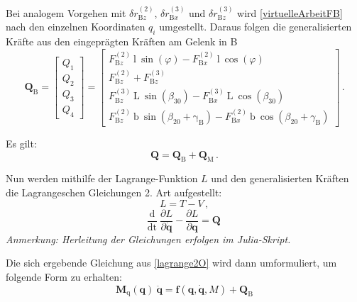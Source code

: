 \documentclass[]{scrartcl}
\begin{document}
Bei analogem Vorgehen mit $\delta r_{\mathrm{B}z}^{(2)}$, $\delta r_{\mathrm{B}x}^{(3)}$ und $\delta r_{\mathrm{B}z}^{(3)}$ wird \eqref{virtuelleArbeitFB} nach den einzelnen Koordinaten $q_i$ umgestellt. Daraus folgen die generalisierten Kräfte aus den eingeprägten Kräften am Gelenk in B
\begin{equation}
	\mathbf{Q}_{\mathrm{B}} = 
	\begin{bmatrix}
		Q_1 \\
		Q_2 \\
		Q_3 \\
		Q_4
	\end{bmatrix}
	=
	\begin{bmatrix}
		F_{\mathrm{B}z}^{(2)} ~ \mathrm{l} ~ \sin(\varphi) - F_{\mathrm{B}x}^{(2)} ~ \mathrm{l} ~ \cos(\varphi)\\
		F_{\mathrm{B}z}^{(2)} + F_{\mathrm{B}z}^{(3)} \\
		F_{\mathrm{B}z}^{(3)} ~ \mathrm{L} ~ \sin(\beta_{30}) - F_{\mathrm{B}x}^{(3)} ~ \mathrm{L} ~ \cos(\beta_{30}) \\
		F_{\mathrm{B}z}^{(2)} ~ \mathrm{b} ~ \sin(\beta_{20} + \mathrm{\gamma_B}) - F_{\mathrm{B}x}^{(2)} ~ \mathrm{b} ~ \cos(\beta_{20} + \gamma_{\mathrm{B}})
	\end{bmatrix} \, .
	\label{genKräfteQ_B}
\end{equation}

Es gilt:
\begin{equation}
	\mathbf{Q} = \mathbf{Q}_{\mathrm{B}} + \mathbf{Q}_{\mathrm{M}} \, .
\end{equation}

Nun werden mithilfe der Lagrange-Funktion $L$ und den generalisierten Kräften die Lagrangeschen Gleichungen 2. Art aufgestellt:
\begin{equation}
	L = T - V \, ,
\end{equation}
\begin{equation}
	\frac{\mathrm{d}}{\mathrm{dt}} ~ \frac{\partial L}{\partial \mathbf{\dot{q}}} - \frac{\partial L}{\partial \mathbf{q}} = \mathbf{Q} \,
	\label{lagrange2O}
\end{equation}
\textit{Anmerkung: Herleitung der Gleichungen erfolgen im Julia-Skript.}

Die sich ergebende Gleichung aus \eqref{lagrange2O} wird dann umformuliert, um folgende Form zu erhalten:
\begin{equation}
\mathbf{M}_{\mathrm{q}}(\mathbf{q}) \ \ddot{\mathbf{q}} = \mathbf{f}(\mathbf{q}, \dot{\mathbf{q}}, M) + \mathbf{Q}_{\mathrm{B}}
\label{formBewegungsgl}
\end{equation}
\end{document}
